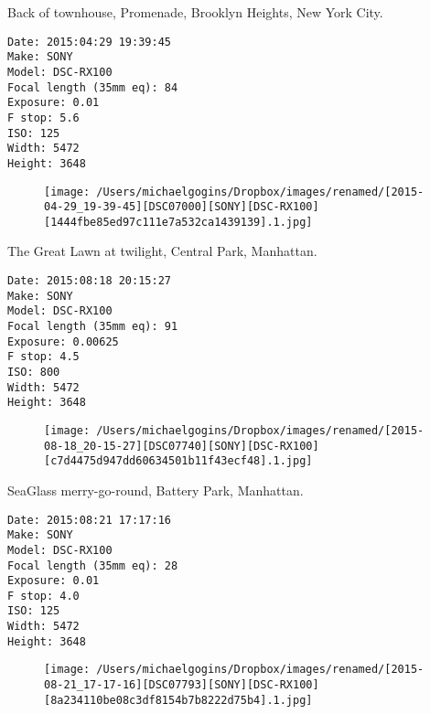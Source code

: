 \documentclass[11pt,letter,DIV=14,paper=landscape]{scrbook}
\begin{document}
\clearpage
\noindent Back of townhouse, Promenade, Brooklyn Heights, New York City.
\noindent
\begin{lstlisting}
Date: 2015:04:29 19:39:45
Make: SONY
Model: DSC-RX100
Focal length (35mm eq): 84
Exposure: 0.01
F stop: 5.6
ISO: 125
Width: 5472
Height: 3648
\end{lstlisting}
\clearpage

\begin{figure}
\texttt{[image: /Users/michaelgogins/Dropbox/images/renamed/[2015-04-29\_19-39-45][DSC07000][SONY][DSC-RX100][1444fbe85ed97c111e7a532ca1439139].1.jpg]}
\end{figure}
    
\clearpage
\noindent The Great Lawn at twilight, Central Park, Manhattan.
\noindent
\begin{lstlisting}
Date: 2015:08:18 20:15:27
Make: SONY
Model: DSC-RX100
Focal length (35mm eq): 91
Exposure: 0.00625
F stop: 4.5
ISO: 800
Width: 5472
Height: 3648
\end{lstlisting}
\clearpage

\begin{figure}
\texttt{[image: /Users/michaelgogins/Dropbox/images/renamed/[2015-08-18\_20-15-27][DSC07740][SONY][DSC-RX100][c7d4475d947dd60634501b11f43ecf48].1.jpg]}
\end{figure}
    
\clearpage
\noindent SeaGlass merry-go-round, Battery Park, Manhattan.
\noindent
\begin{lstlisting}
Date: 2015:08:21 17:17:16
Make: SONY
Model: DSC-RX100
Focal length (35mm eq): 28
Exposure: 0.01
F stop: 4.0
ISO: 125
Width: 5472
Height: 3648
\end{lstlisting}
\clearpage

\begin{figure}
\texttt{[image: /Users/michaelgogins/Dropbox/images/renamed/[2015-08-21\_17-17-16][DSC07793][SONY][DSC-RX100][8a234110be08c3df8154b7b8222d75b4].1.jpg]}
\end{figure}
    
\end{document}
